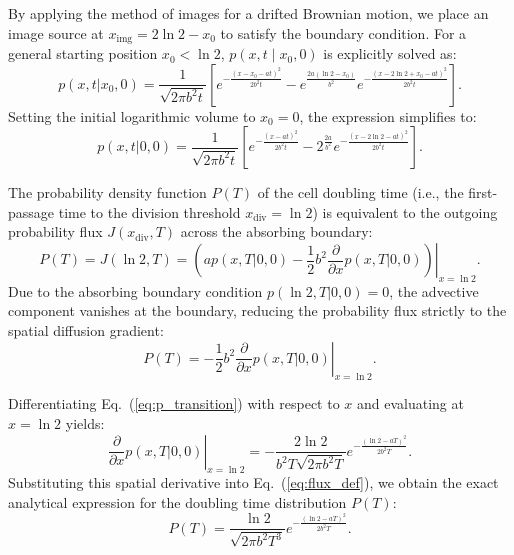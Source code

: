 \documentclass[aps, prl, longbibliography, linenumbers, superscriptaddress]{revtex4-2}
\begin{document}
By applying the method of images for a drifted Brownian motion, we place an image source at $x_{\text{img}} = 2\ln 2 - x_0$ to satisfy the boundary condition. For a general starting position $x_0 < \ln 2$, $p(x, t \mid x_0, 0)$ is explicitly solved as:
\begin{equation}
p(x, t | x_0, 0) = \frac{1}{\sqrt{2\pi b^2 t}} \left[ e^{-\frac{(x - x_0 - at)^2}{2b^2 t}} - e^{\frac{2a(\ln 2 - x_0)}{b^2}} e^{-\frac{(x - 2\ln 2 + x_0 - at)^2}{2b^2 t}} \right].
\end{equation}
Setting the initial logarithmic volume to $x_0 = 0$, the expression simplifies to:
\begin{equation}
p(x, t | 0, 0) = \frac{1}{\sqrt{2\pi b^2 t}} \left[ e^{-\frac{(x - at)^2}{2b^2 t}} - 2^{\frac{2a}{b^2}} e^{-\frac{(x - 2\ln 2 - at)^2}{2b^2 t}} \right].
\label{eq:p_transition}
\end{equation}

The probability density function $P(T)$ of the cell doubling time (i.e., the first-passage time to the division threshold $x_{\text{div}} = \ln 2$) is equivalent to the outgoing probability flux $J(x_{\text{div}}, T)$ across the absorbing boundary:
\begin{equation}
P(T) = J(\ln 2, T) = \left. \left( a p(x, T | 0, 0) - \frac{1}{2} b^2 \frac{\partial}{\partial x} p(x, T | 0, 0) \right) \right|_{x = \ln 2}.
\end{equation}
Due to the absorbing boundary condition $p(\ln 2, T | 0, 0) = 0$, the advective component vanishes at the boundary, reducing the probability flux strictly to the spatial diffusion gradient:
\begin{equation}
P(T) = -\left. \frac{1}{2} b^2 \frac{\partial}{\partial x} p(x, T | 0, 0) \right|_{x = \ln 2}.
\label{eq:flux_def}
\end{equation}

Differentiating Eq.~(\ref{eq:p_transition}) with respect to $x$ and evaluating at $x = \ln 2$ yields:
\begin{equation}
\left. \frac{\partial}{\partial x} p(x, T | 0, 0) \right|_{x = \ln 2} = -\frac{2\ln 2}{b^2 T \sqrt{2\pi b^2 T}} e^{-\frac{(\ln 2 - aT)^2}{2b^2 T}}.
\end{equation}
Substituting this spatial derivative into Eq.~(\ref{eq:flux_def}), we obtain the exact analytical expression for the doubling time distribution $P(T)$:
\begin{equation}
P(T) = \frac{\ln 2}{\sqrt{2\pi b^2 T^3}} e^{-\frac{(\ln 2 - aT)^2}{2b^2 T}}.
\label{eq:P_final}
\end{equation}
\end{document}
